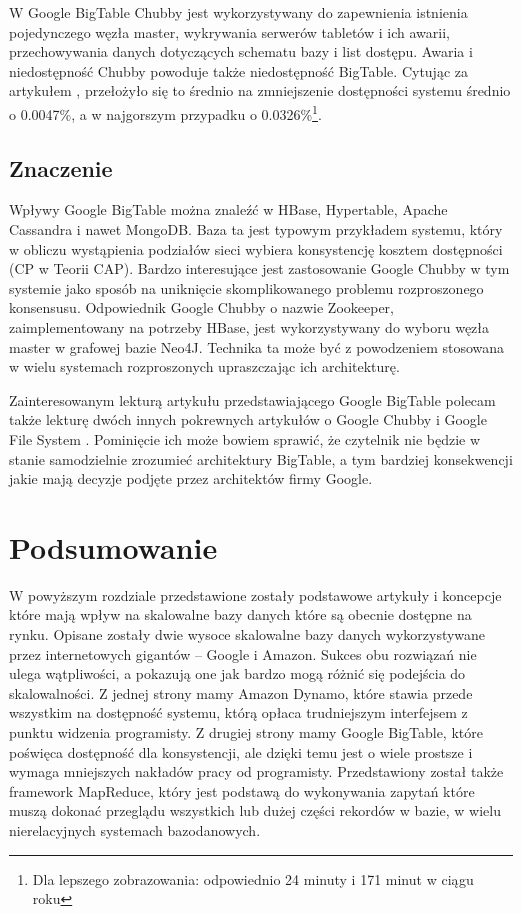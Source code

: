 W Google BigTable Chubby jest wykorzystywany do zapewnienia istnienia pojedynczego węzła master, wykrywania serwerów tabletów i ich awarii, przechowywania danych dotyczących schematu bazy i list dostępu.
Awaria i niedostępność Chubby powoduje także niedostępność BigTable.
Cytując za artykułem \cite{google-bigtable}, przełożyło się to średnio na zmniejszenie dostępności systemu średnio o 0.0047\%, a w najgorszym przypadku o 0.0326\%\footnote{Dla lepszego zobrazowania: odpowiednio 24 minuty i 171 minut w ciągu roku}.

\subsection*{Znaczenie}

Wpływy Google BigTable można znaleźć w HBase, Hypertable, Apache Cassandra i nawet MongoDB.
Baza ta jest typowym przykładem systemu, który w obliczu wystąpienia podziałów sieci wybiera konsystencję kosztem dostępności (CP w Teorii CAP).
Bardzo interesujące jest zastosowanie Google Chubby w tym systemie jako sposób na uniknięcie skomplikowanego problemu rozproszonego konsensusu.
Odpowiednik Google Chubby o nazwie Zookeeper, zaimplementowany na potrzeby HBase, jest wykorzystywany do wyboru węzła master w grafowej bazie Neo4J.
Technika ta może być z powodzeniem stosowana w wielu systemach rozproszonych upraszczając ich architekturę.

Zainteresowanym lekturą artykułu przedstawiającego Google BigTable \cite{google-bigtable} polecam także lekturę dwóch innych pokrewnych artykułów o Google Chubby \cite{google-chubby} i Google File System \cite{google-file-system}.
Pominięcie ich może bowiem sprawić, że czytelnik nie będzie w stanie samodzielnie zrozumieć architektury BigTable, a tym bardziej konsekwencji jakie mają decyzje podjęte przez architektów firmy Google.

\section{Podsumowanie}

W powyższym rozdziale przedstawione zostały podstawowe artykuły i koncepcje które mają wpływ na skalowalne bazy danych które są obecnie dostępne na rynku.
Opisane zostały dwie wysoce skalowalne bazy danych wykorzystywane przez internetowych gigantów -- Google i Amazon.
Sukces obu rozwiązań nie ulega wątpliwości, a pokazują one jak bardzo mogą różnić się podejścia do skalowalności.
Z jednej strony mamy Amazon Dynamo, które stawia przede wszystkim na dostępność systemu, którą opłaca trudniejszym interfejsem z punktu widzenia programisty.
Z drugiej strony mamy Google BigTable, które poświęca dostępność dla konsystencji, ale dzięki temu jest o wiele prostsze i wymaga mniejszych nakładów pracy od programisty.
Przedstawiony został także framework MapReduce, który jest podstawą do wykonywania zapytań które muszą dokonać przeglądu wszystkich lub dużej części rekordów w bazie, w wielu nierelacyjnych systemach bazodanowych.